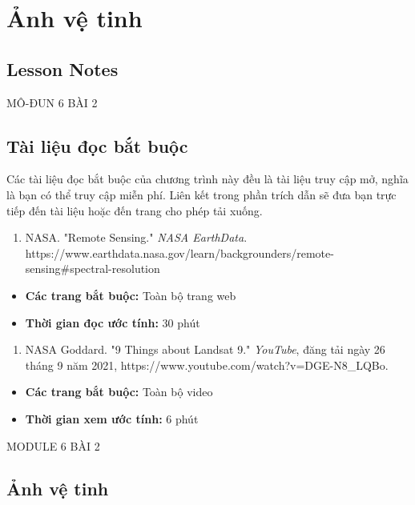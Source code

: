 \chapter{Ảnh vệ tinh}
\label{ch:M6L2LessonNotes}

\section*{Lesson Notes}

MÔ-ĐUN 6 \textbar{} BÀI 2

\section{Tài liệu đọc bắt buộc}

Các tài liệu đọc bắt buộc của chương trình này đều là tài liệu truy cập mở, nghĩa là bạn có thể truy cập miễn phí. Liên kết trong phần trích dẫn sẽ đưa bạn trực tiếp đến tài liệu hoặc đến trang cho phép tải xuống.

\begin{enumerate}
\def\labelenumi{\arabic{enumi}.}
\item
  NASA. "Remote Sensing." \emph{NASA EarthData}. https://www.earthdata.nasa.gov/learn/backgrounders/remote-sensing\#spectral-resolution
\end{enumerate}

\begin{itemize}
\item
  \textbf{Các trang bắt buộc:} Toàn bộ trang web
\item
  \textbf{Thời gian đọc ước tính:} 30 phút
\end{itemize}

\begin{enumerate}
\def\labelenumi{\arabic{enumi}.}
\setcounter{enumi}{1}
\item
  NASA Goddard. "9 Things about Landsat 9." \emph{YouTube}, đăng tải ngày 26 tháng 9 năm 2021, https://www.youtube.com/watch?v=DGE-N8\_LQBo.
\end{enumerate}

\begin{itemize}
\item
  \textbf{Các trang bắt buộc:} Toàn bộ video
\item
  \textbf{Thời gian xem ước tính:} 6 phút
\end{itemize}

MODULE 6 \textbar{} BÀI 2

\section{Ảnh vệ tinh}

